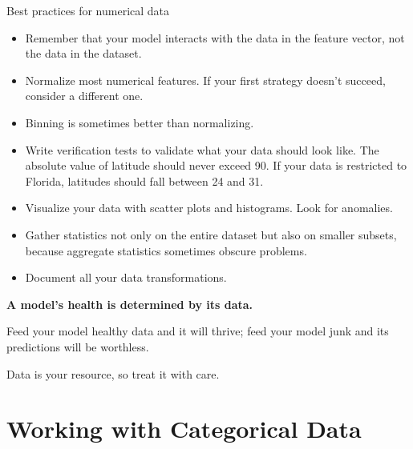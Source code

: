 \begin{frame}{Best practices for numerical data}
  \begin{withmargin}
    \begin{tdmain}
      \footnotesize
      \begin{itemize}
        \item Remember that your model interacts with the data in the feature
          vector, not the data in the dataset.
        \item Normalize most numerical features. If your first strategy doesn't
          succeed, consider a different one.
        \item Binning is sometimes better than normalizing.
        \item Write verification tests to validate what your data should look
          like. The absolute value of latitude should never exceed 90. If your
          data is restricted to Florida, latitudes should fall between 24 and 31.
        \item Visualize your data with scatter plots and histograms. Look for
          anomalies.
        \item Gather statistics not only on the entire dataset but also on
          smaller subsets, because aggregate statistics sometimes obscure
          problems.
        \item Document all your data transformations.
      \end{itemize}
    \end{tdmain}
    \begin{tdmargin}
      \vfill
      {\color{tdfg}\textbf{A model's health is determined by its data.}}
      \par\medskip
      Feed your model healthy data and it will thrive; feed your model junk and
      its predictions will be worthless.
      \par\medskip
      Data is your  resource, so treat it with care.
      \vfill
    \end{tdmargin}
  \end{withmargin}
\end{frame}

\section[Categorical data]{Working with Categorical Data}

